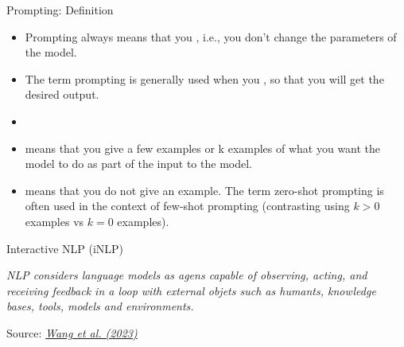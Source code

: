 \begin{frame}{Prompting: Definition}

\vfill

\begin{itemize}

\item Prompting always means that you ,
i.e., you don't change the parameters of the model.

\item The term prompting is generally used when you , so that you will get the
desired output.

\item {}

\item {} means that you give a few
examples or k examples of what you want the model to do
as part of the input to the model.

\item {} means that you do not give an example.
The term zero-shot prompting is often used in the context of
few-shot prompting (contrasting using $k>0$ examples vs $k=0$
examples).

\end{itemize}

\vfill

\end{frame}






























\begin{vbframe}{Interactive NLP (\MakeLowercase{i}NLP)}

\vfill

\emph{NLP considers language models as agens capable of observing, acting, and receiving feedback in a loop with external objets such as humants, knowledge bases, tools, models and environments.} \vskip2mm

\footnotesize{Source:} \href{https://arxiv.org/pdf/2305.13246.pdf}{\footnotesize \it Wang et al. (2023)}

\vfill

\end{vbframe}

